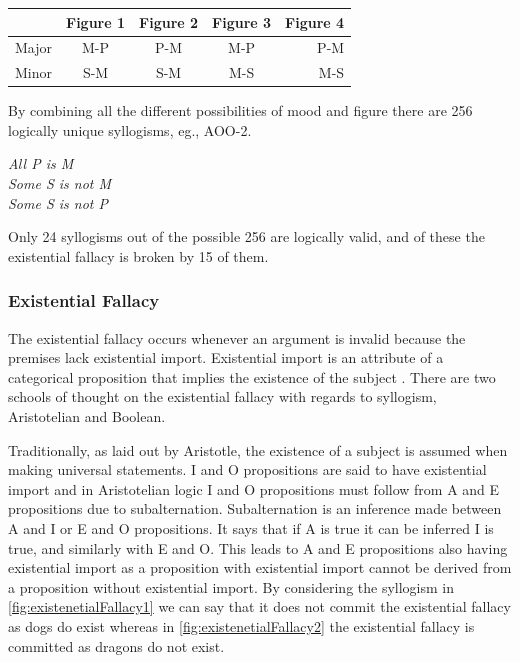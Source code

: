 \documentclass[12pt,a4paper]{report}
\newenvironment{tightcenter}{%
  \setlength\topsep{0pt}
  \setlength\parskip{0pt}
  \begin{center}
}{%
  \end{center}
}
\begin{document}
\begin{center}
  \begin{tabular}{ l | c | c | c | r }
     & Figure 1 & Figure 2 & Figure 3 & Figure 4 \\ \hline
    Major & M-P & P-M & M-P & P-M \\ \hline
    Minor & S-M & S-M & M-S & M-S \\
  \end{tabular}
\end{center}

By combining all the different possibilities of mood and figure there are 256 logically unique syllogisms, eg., AOO-2. 
\bigbreak
\begin{tightcenter}
\textit{All P is M}\\ 
\textit{Some S is not M}\\
\textit{Some S is not P}\\
\end{tightcenter}
\bigbreak

Only 24 syllogisms out of the possible 256 are logically valid, and of these the existential fallacy is broken by 15 of them.

\subsubsection{Existential Fallacy}

The existential fallacy occurs whenever an argument is invalid because the premises lack existential import. Existential import is an attribute of a categorical proposition that implies the existence of the subject \citep{hurley2005concise}. There are two schools of thought on the existential fallacy with regards to syllogism, Aristotelian and Boolean.

Traditionally, as laid out by Aristotle, the existence of a subject is assumed when making universal statements. I and O propositions are said to have existential import and in Aristotelian logic I and O propositions must follow from A and E propositions due to subalternation. Subalternation is an inference made between A and I or E and O propositions. It says that if A is true it can be inferred I is true, and similarly with E and O. This leads to A and E propositions also having existential import as a proposition with existential import cannot be derived from a proposition without existential import.
By considering the syllogism in \ref{fig:existenetialFallacy1} we can say that it does not commit the existential fallacy as dogs do exist whereas in \ref{fig:existenetialFallacy2} the existential fallacy is committed as dragons do not exist. 
\end{document}
